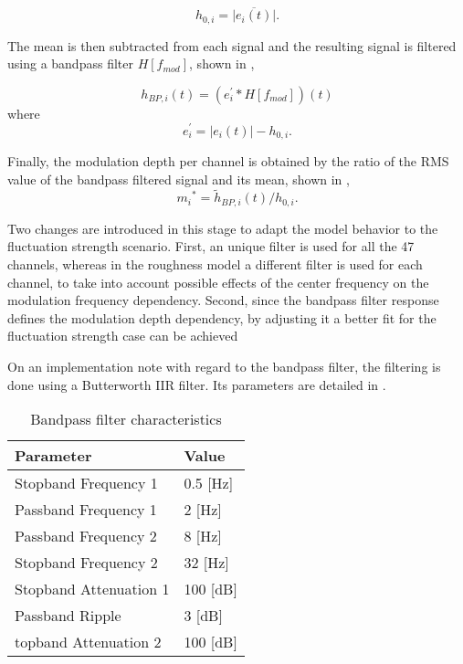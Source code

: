 \documentclass[../main.tex]{subfiles}
\begin{document}
\begin{modelchapter}
\begin{equation}
  h_{0,i} = \overline{|e_{i}(t)|}.
  \label{eq:h0i}
\end{equation}

The mean is then subtracted from each signal and the resulting signal is
filtered using a bandpass filter $H[f_{mod}]$, shown in ,

\begin{equation}
  h_{BP,i}(t) = (e_{i}^{\prime} * H[f_{mod}])(t)
  \label{eq:hBPi}
\end{equation}
where
\begin{equation}
  e_{i}^{\prime} = |e_{i}(t)| - h_{0,i}.
\end{equation}

Finally, the modulation depth per channel is obtained by the ratio of the
\gls{RMS} value of the bandpass filtered signal and its mean, shown in
,
\begin{equation}
  {m_i}^* = \tilde{h}_{BP,i}(t)/h_{0,i}.
  \label{eq:mi*}
\end{equation}

Two changes are introduced in this stage to adapt the model behavior to the
fluctuation strength scenario. First, an unique filter is used for all the 47
channels, whereas in the roughness model a different filter is used for each
channel, to take into account possible effects of the center frequency on the
modulation frequency dependency. Second, since the bandpass filter response
defines the modulation depth dependency, by adjusting it a better fit for the
fluctuation strength case can be achieved

On an implementation note with regard to the bandpass filter, the filtering is
done using a Butterworth \gls{IIR} filter. Its parameters are detailed in
.

\begin{table}[!ht]
  \centering
  \begin{tabu} to \linewidth{XX}
    \toprule
    \rowfont\bfseries
    Parameter & Value \\
    \midrule
    Stopband Frequency 1 & 0.5 [Hz] \\
    Passband Frequency 1 & 2 [Hz] \\
    Passband Frequency 2 & 8 [Hz] \\
    Stopband Frequency 2 & 32 [Hz] \\
    Stopband Attenuation 1 & 100 [dB] \\
    Passband Ripple & 3 [dB] \\
    topband Attenuation 2 & 100 [dB] \\
    \bottomrule
  \end{tabu}
  \caption{Bandpass filter characteristics}
\label{tab:bandpass_filter}
\end{table}


\end{modelchapter}
\end{document}
